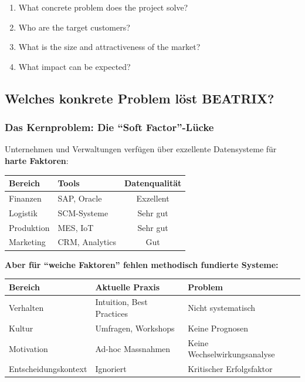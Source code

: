 \documentclass[11pt,a4paper]{article}
\begin{document}
\begin{enumerate}
    \item What concrete problem does the project solve?
    \item Who are the target customers?
    \item What is the size and attractiveness of the market?
    \item What impact can be expected?
\end{enumerate}

\subsection{Welches konkrete Problem löst BEATRIX?}

\subsubsection{Das Kernproblem: Die ``Soft Factor''-Lücke}

Unternehmen und Verwaltungen verfügen über exzellente Datensysteme für \textbf{harte Faktoren}:

\begin{table}[h]
\centering
\begin{tabular}{llc}
\toprule
\textbf{Bereich} & \textbf{Tools} & \textbf{Datenqualität} \\
\midrule
Finanzen & SAP, Oracle & Exzellent \\
Logistik & SCM-Systeme & Sehr gut \\
Produktion & MES, IoT & Sehr gut \\
Marketing & CRM, Analytics & Gut \\
\bottomrule
\end{tabular}
\end{table}

\textbf{Aber für ``weiche Faktoren'' fehlen methodisch fundierte Systeme:}

\begin{table}[h]
\centering
\begin{tabularx}{\textwidth}{lXX}
\toprule
\textbf{Bereich} & \textbf{Aktuelle Praxis} & \textbf{Problem} \\
\midrule
Verhalten & Intuition, Best Practices & Nicht systematisch \\
Kultur & Umfragen, Workshops & Keine Prognosen \\
Motivation & Ad-hoc Massnahmen & Keine Wechselwirkungsanalyse \\
Entscheidungskontext & Ignoriert & Kritischer Erfolgsfaktor \\
\bottomrule
\end{tabularx}
\end{table}
\end{document}
